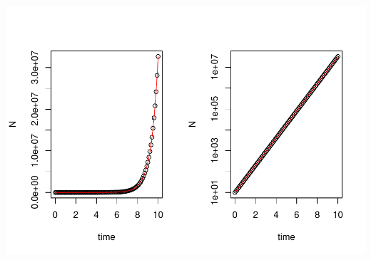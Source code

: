 \documentclass[
]{book}
\begin{document}
\includegraphics{bookdown-demo_files/figure-latex/unnamed-chunk-6-1.pdf}
\end{document}
